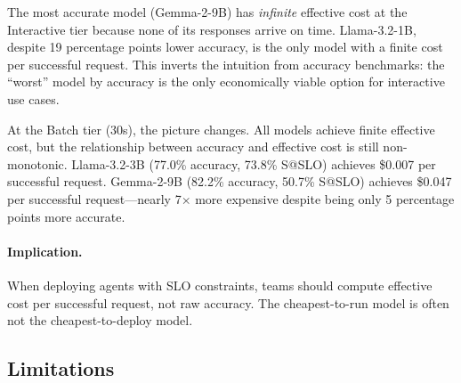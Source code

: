 \documentclass[11pt]{article}
\begin{document}
The most accurate model (Gemma-2-9B) has \emph{infinite} effective cost at the Interactive tier because none of its responses arrive on time. Llama-3.2-1B, despite 19 percentage points lower accuracy, is the only model with a finite cost per successful request. This inverts the intuition from accuracy benchmarks: the ``worst'' model by accuracy is the only economically viable option for interactive use cases.

At the Batch tier (30s), the picture changes. All models achieve finite effective cost, but the relationship between accuracy and effective cost is still non-monotonic. Llama-3.2-3B (77.0\% accuracy, 73.8\% S@SLO) achieves \$0.007 per successful request. Gemma-2-9B (82.2\% accuracy, 50.7\% S@SLO) achieves \$0.047 per successful request---nearly 7$\times$ more expensive despite being only 5 percentage points more accurate.

\paragraph{Implication.} When deploying agents with SLO constraints, teams should compute effective cost per successful request, not raw accuracy. The cheapest-to-run model is often not the cheapest-to-deploy model.

\subsection{Limitations}
\end{document}
